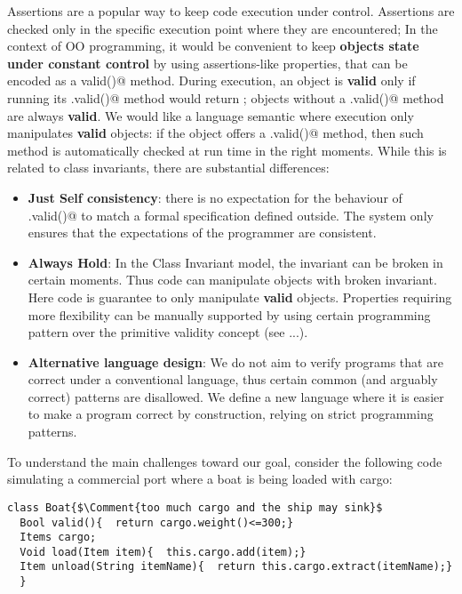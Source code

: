 Assertions are a popular way to keep code execution
under control. Assertions are checked only in the specific
execution point where they are encountered;
In the context of OO programming, it would be
convenient to keep \textbf{objects state
under constant control} by using assertions-like properties, that
can be encoded as a \Q@Bool valid()@ method.
During execution,
an object is \textbf{valid} only if running its
\Q@.valid()@ method would return \Q@true@;
objects without a \Q@.valid()@ method are always \textbf{valid}.
We would like a language semantic where 
execution only manipulates \textbf{valid} objects:
if the object offers a \Q@.valid()@ method, then such
 method is automatically checked at run time in the right moments.
While this is related to class invariants,
there are substantial differences:
\begin{itemize}
\item \textbf{Just Self consistency}: there is no expectation for
the behaviour of \Q@.valid()@ to match a formal specification defined outside.
The system only ensures that the expectations of the programmer are consistent.
\item \textbf{Always Hold}: 
In the Class Invariant model, the invariant can be broken in
certain moments. Thus code can manipulate objects with broken invariant.
Here code is guarantee to only manipulate \textbf{valid} objects.
Properties requiring more flexibility can be manually supported by
 using certain programming pattern over the primitive validity concept (see ...).
\item \textbf{Alternative language design}:
We do not aim to verify programs that are correct under a conventional language,
thus certain common (and arguably correct) patterns are disallowed.
We define a new language where it is easier to make a program correct by construction, relying on
strict programming patterns.
\end{itemize}

\noindent To understand the main challenges
toward our goal,
consider the following code 
simulating a commercial port
 where a boat is being loaded with cargo:
\saveSpace
\begin{lstlisting}
class Boat{$\Comment{too much cargo and the ship may sink}$
  Bool valid(){  return cargo.weight()<=300;}
  Items cargo;
  Void load(Item item){  this.cargo.add(item);}
  Item unload(String itemName){  return this.cargo.extract(itemName);}
  }
\end{lstlisting}
\saveSpace




